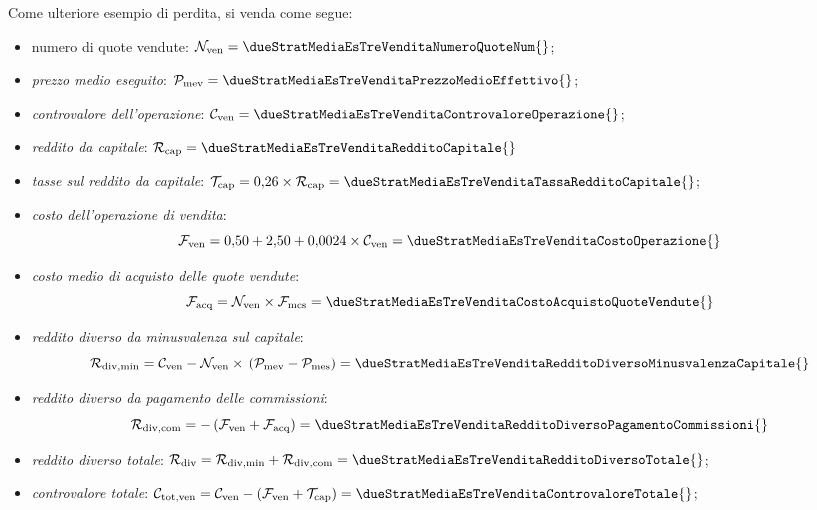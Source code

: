 \documentclass[12pt,a4paper]{article}
\newcommand{\CalcoloCostoOperazioneSim}[1]{\num{0,50} + \num{2,50} + \num{0,0024} \times{} #1}
\newcommand{\CalcoloTasseSim}[1]{\num{0,26} \times{} #1}
\newcommand{\Nven}[1]{\mathcal{N}_{\textrm{ven}#1}}
\newcommand{\Pme}[1]{\mathcal{P}_{\mathrm{me}#1}}
\newcommand{\Pmev}[1]{\mathcal{P}_{\mathrm{mev}#1}}
\newcommand{\Pmes}[1]{\Pme{\mathrm{s}#1}}
\newcommand{\Cven}[1]{\mathcal{C}_{\mathrm{ven}#1}}
\newcommand{\Ctotven}[1]{\mathcal{C}_{\mathrm{tot,ven}#1}}
\newcommand{\Rcap}[1]{\mathcal{R}_{\mathrm{cap}#1}}
\newcommand{\Rdiv}[1]{\mathcal{R}_{\mathrm{div}#1}}
\newcommand{\Rdivmin}[1]{\mathcal{R}_{\mathrm{div,min}#1}}
\newcommand{\Rdivcom}[1]{\mathcal{R}_{\mathrm{div,com}#1}}
\newcommand{\Tredcap}[1]{\mathcal{T}_{\mathrm{cap}#1}}
\newcommand{\Facq}[1]{\mathcal{F}_{\mathrm{acq}#1}}
\newcommand{\Fven}[1]{\mathcal{F}_{\mathrm{ven}#1}}
\newcommand{\Fmcs}[1]{\mathcal{F}_{\mathrm{mcs}#1}}
\begin{document}
Come ulteriore esempio di perdita, si venda come segue:
\begin{itemize}
\item numero di quote vendute:
  \(\Nven{} = \dueStratMediaEsTreVenditaNumeroQuoteNum{}\);
\item \emph{prezzo medio eseguito}:
  \(\Pmev{} = \dueStratMediaEsTreVenditaPrezzoMedioEffettivo{}\);
\item \emph{controvalore dell'operazione}:
  \(\Cven{} = \dueStratMediaEsTreVenditaControvaloreOperazione{}\);

\item \emph{reddito da capitale}: \(\Rcap{} = \dueStratMediaEsTreVenditaRedditoCapitale{}\)
\item            \emph{tasse             sul            reddito             da            capitale}:
  \(\Tredcap{} = \CalcoloTasseSim{\Rcap{}} = \dueStratMediaEsTreVenditaTassaRedditoCapitale{}\);

\item \emph{costo dell'operazione di vendita}:
  \begin{equation*}
    \Fven{} = \CalcoloCostoOperazioneSim{\Cven{}} = \dueStratMediaEsTreVenditaCostoOperazione{}
  \end{equation*}
\item \emph{costo medio di acquisto delle quote vendute}:
  \begin{equation*}
    \Facq{} = \Nven{} \times{} \Fmcs{} = \dueStratMediaEsTreVenditaCostoAcquistoQuoteVendute{}
  \end{equation*}
\item \emph{reddito diverso da minusvalenza sul capitale}:
  \begin{equation*}
    \Rdivmin{}
    = \Cven{} - \Nven{} \times{} \left( \Pmev{} - \Pmes{} \right)
    = \dueStratMediaEsTreVenditaRedditoDiversoMinusvalenzaCapitale{}
  \end{equation*}
\item \emph{reddito diverso da pagamento delle commissioni}:
  \begin{equation*}
    \Rdivcom{}
    = - \left( \Fven{} + \Facq{} \right)
    = \dueStratMediaEsTreVenditaRedditoDiversoPagamentoCommissioni{}
  \end{equation*}
\item \emph{reddito diverso totale}:
  \(\Rdiv{} = \Rdivmin{} + \Rdivcom{} = \dueStratMediaEsTreVenditaRedditoDiversoTotale{}\);

\item \emph{controvalore totale}:
  \(\Ctotven{} = \Cven{} - \left( \Fven{} + \Tredcap{} \right) = \dueStratMediaEsTreVenditaControvaloreTotale{}\);


\end{itemize}
\end{document}
